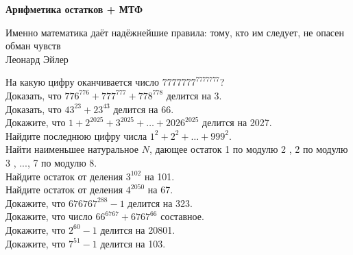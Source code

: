 \centerline{\bf \Huge Арифметика остатков + МТФ}

\begin{flushright}
        \scriptsize{Именно математика даёт надёжнейшие правила: тому, кто им следует, не опасен обман чувств\\ Леонард Эйлер}
\end{flushright}

 На какую цифру оканчивается число $7777777^{7777777}$?\\

 Доказать, что $776^{776}+777^{777}+778^{778}$ делится на 3.\\

 Доказать, что $43^{23}+23^{43}$ делится на 66.\\

 Докажите, что $1+2^{2025}+3^{2025}+\ldots+2026^{2025}$ делится на 2027.\\

 Найдите последнюю цифру числа $1^2+2^2+\ldots+999^2$.\\

 Найти наименьшее натуральное $N$, дающее остаток 1 по модулю 2 , 2 по модулю 3 , ..., 7 по модулю 8.\\

 Найдите остаток от деления $3^{102}$ на 101.\\

 Найдите остаток от деления $4^{2050}$ на 67.\\

 Докажите, что $676767^{288}-1$ делится на 323.\\

 Докажите, что число $66^{6767}+6767^{66}$ составное.\\

 Докажите, что $2^{60}-1$ делится на 20801.\\

 Докажите, что $7^{51}-1$ делится на 103.